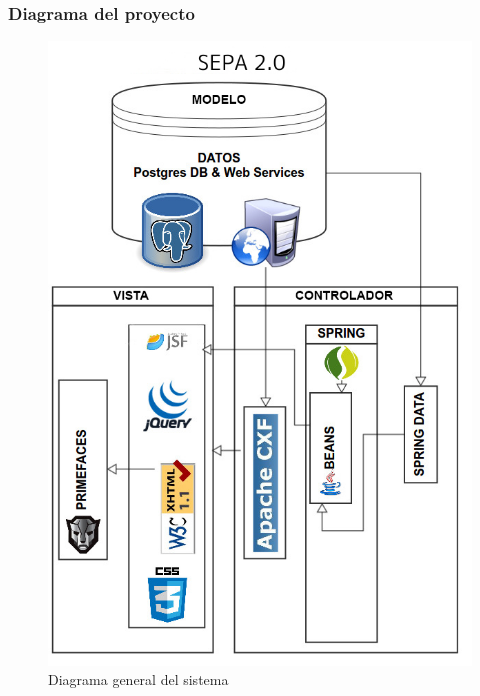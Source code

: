 \documentclass{beamer}
\begin{document}

\begin{frame}
\frametitle{Diagrama del proyecto}
\begin{figure}[!hbp]
\begin{center}
\includegraphics[scale=0.2,angle=0]{images/diagrama2.jpg}
\caption{Diagrama general del sistema}
\label{Diagrama general del sistema}
\end{center}
\end{figure}
\end{frame}

\end{document}
